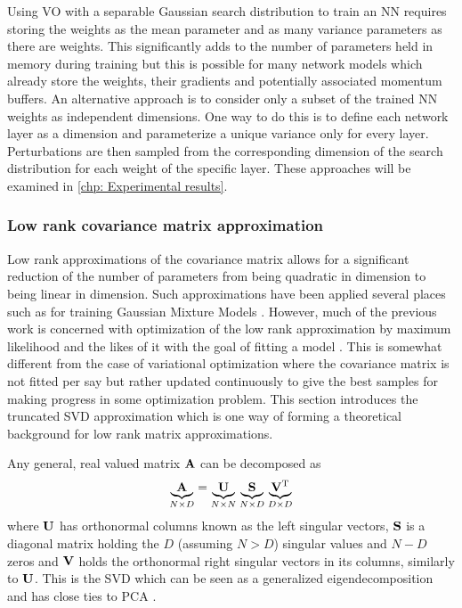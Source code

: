 Using \gls{VO} with a separable Gaussian search distribution to train an \gls{NN} requires storing the weights as the mean parameter and as many variance parameters as there are weights. This significantly adds to the number of parameters held in memory during training but this is possible for many network models which already store the weights, their gradients and potentially associated momentum buffers.
An alternative approach is to consider only a subset of the trained \gls{NN} weights as independent dimensions. One way to do this is to define each network layer as a dimension and parameterize a unique variance only for every layer. Perturbations are then sampled from the corresponding dimension of the search distribution for each weight of the specific layer. These approaches will be examined in \autoref{chp: Experimental results}.


\subsubsection{Low rank covariance matrix approximation}\label{sec: Variational optimization: Low rank approximation}
Low rank approximations of the covariance matrix allows for a significant reduction of the number of parameters from being quadratic in dimension to being linear in dimension. Such approximations have been applied several places such as for training Gaussian Mixture Models \cite{Magdon-Ismail2010}. However, much of the previous work is concerned with optimization of the low rank approximation by maximum likelihood and the likes of it with the goal of fitting a model \cite{Belabbas2007, Duan2014, Turek2017}. This is somewhat different from the case of variational optimization where the covariance matrix is not fitted per say but rather updated continuously to give the best samples for making progress in some optimization problem. 
This section introduces the truncated SVD approximation which is one way of forming a theoretical background for low rank matrix approximations.

Any general, real valued matrix $\A$ can be decomposed as
\begin{equation}
    \underset{N\times D}{\underbrace{\A}} = \underset{N\times N}{\underbrace{\U}}\;\underset{N\times D}{\underbrace{\S}}\;\underset{D\times D}{\underbrace{\V\transpose}}
\end{equation}
where $\U$ has orthonormal columns known as the left singular vectors, $\S$ is a diagonal matrix holding the $D$ (assuming $N>D$) singular values and $N-D$ zeros and $\V$ holds the orthonormal right singular vectors in its columns, similarly to $\U$. This is the \gls{SVD} which can be seen as a generalized eigendecomposition and has close ties to \gls{PCA} \cite{Murphy2012}.

